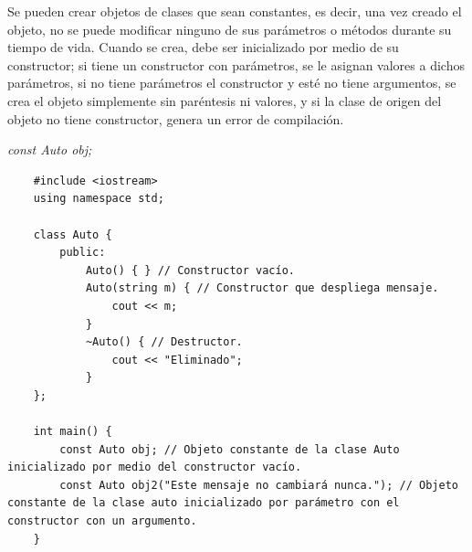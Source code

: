 Se pueden crear objetos de clases que sean constantes, es decir, una vez creado el objeto, no se puede modificar ninguno de sus parámetros o métodos durante su tiempo de vida. Cuando se crea, debe ser inicializado por medio de su constructor; si tiene un constructor con parámetros, se le asignan valores a dichos parámetros, si no tiene parámetros el constructor y esté no tiene argumentos, se crea el objeto simplemente sin paréntesis ni valores, y si la clase de origen del objeto no tiene constructor, genera un error de compilación.
\begin{center}
	\textit{const Auto obj;}
\end{center}
\begin{lstlisting}
    #include <iostream>
    using namespace std;
    
    class Auto {
        public:
            Auto() { } // Constructor vacío.
            Auto(string m) { // Constructor que despliega mensaje.
                cout << m;
            }
            ~Auto() { // Destructor.
                cout << "Eliminado";
            }
    };
    
    int main() {
        const Auto obj; // Objeto constante de la clase Auto inicializado por medio del constructor vacío.
        const Auto obj2("Este mensaje no cambiará nunca."); // Objeto constante de la clase auto inicializado por parámetro con el constructor con un argumento.
    }
\end{lstlisting}

